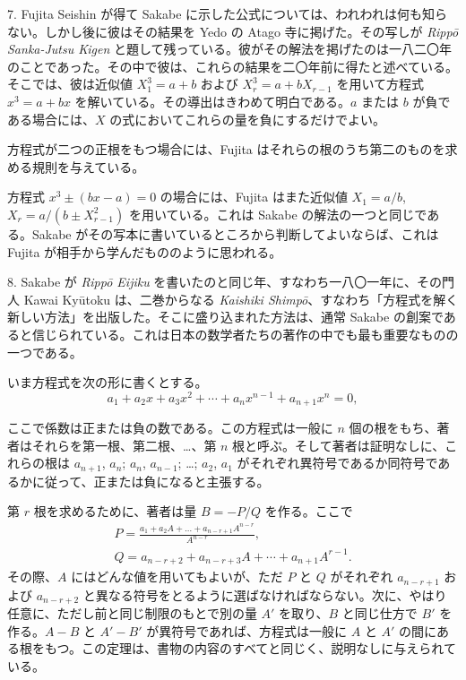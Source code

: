 \documentclass[11pt]{article}
\newcommand{\scanpage}[2]{\clearpage\setcounter{footnote}{0}\noindent{\footnotesize\color{gray}PDF #1 頁 · #2}\par\medskip}
\begin{document}
7. Fujita Seishin が得て Sakabe に示した公式については、われわれは何も知らない。しかし後に彼はその結果を Yedo の Atago 寺に掲げた。その写しが \emph{Rippō Sanka-Jutsu Kigen} と題して残っている。彼がその解法を掲げたのは一八二〇年のことであった。その中で彼は、これらの結果を二〇年前に得たと述べている。そこでは、彼は近似値 $X_1^3 = a + b$ および $X_r^3 = a + bX_{r-1}$ を用いて方程式 $x^3 = a + bx$ を解いている。その導出はきわめて明白である。$a$ または $b$ が負である場合には、$X$ の式においてこれらの量を負にするだけでよい。

方程式が二つの正根をもつ場合には、Fujita はそれらの根のうち第二のものを求める規則を与えている。

方程式 $x^3 \pm (bx - a) = 0$ の場合には、Fujita はまた近似値 $X_1 = a/b$, $X_r = a/(b \pm X_{r-1}^2)$ を用いている。これは Sakabe の解法の一つと同じである。Sakabe がその写本に書いているところから判断してよいならば、これは Fujita が相手から学んだもののように思われる。

8. Sakabe が \emph{Rippō Eijiku} を書いたのと同じ年、すなわち一八〇一年に、その門人 Kawai Kyūtoku は、二巻からなる \emph{Kaishiki Shimpō}、すなわち「方程式を解く新しい方法」を出版した。そこに盛り込まれた方法は、通常 Sakabe の創案であると信じられている。これは日本の数学者たちの著作の中でも最も重要なものの一つである。

いま方程式を次の形に書くとする。
\[
a_1 + a_2 x + a_3 x^2 + \cdots + a_n x^{n-1} + a_{n+1} x^n = 0,
\]

\scanpage{0278}{印刷頁 264 (top left)}
ここで係数は正または負の数である。この方程式は一般に $n$ 個の根をもち、著者はそれらを第一根、第二根、\dots、第 $n$ 根と呼ぶ。そして著者は証明なしに、これらの根は $a_{n+1}$, $a_n$; $a_n$, $a_{n-1}$; \dots; $a_2$, $a_1$ がそれぞれ異符号であるか同符号であるかに従って、正または負になると主張する。

第 $r$ 根を求めるために、著者は量 $B = -P/Q$ を作る。ここで
\begin{gather*}
P = \frac{a_1 + a_2 A + \ldots + a_{n-r+1} A^{n-r}}{A^{n-r}},\\
Q = a_{n-r+2} + a_{n-r+3} A + \cdots + a_{n+1} A^{r-1}.
\end{gather*}
その際、$A$ にはどんな値を用いてもよいが、ただ $P$ と $Q$ がそれぞれ $a_{n-r+1}$ および $a_{n-r+2}$ と異なる符号をとるように選ばなければならない。次に、やはり任意に、ただし前と同じ制限のもとで別の量 $A'$ を取り、$B$ と同じ仕方で $B'$ を作る。$A - B$ と $A' - B'$ が異符号であれば、方程式は一般に $A$ と $A'$ の間にある根をもつ。この定理は、書物の内容のすべてと同じく、説明なしに与えられている。
\end{document}

